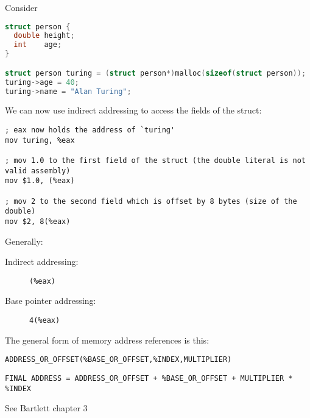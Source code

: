 

Consider
\begin{lstlisting}[language=C]
struct person {
  double height;
  int    age;
}

struct person turing = (struct person*)malloc(sizeof(struct person));
turing->age = 40;
turing->name = "Alan Turing";
\end{lstlisting}

We can now use indirect addressing to access the fields of the struct:

\begin{lstlisting}[language={[x86masm]Assembler}]
; eax now holds the address of `turing'
mov turing, %eax

; mov 1.0 to the first field of the struct (the double literal is not valid assembly)
mov $1.0, (%eax)

; mov 2 to the second field which is offset by 8 bytes (size of the double)
mov $2, 8(%eax)
\end{lstlisting}


Generally:
\begin{description}
\item[Indirect addressing:] \texttt{(\%eax)}
\item[Base pointer addressing:] \texttt{4(\%eax)}
\end{description}

The general form of memory address references is this:

\texttt{ADDRESS\_OR\_OFFSET(\%BASE\_OR\_OFFSET,\%INDEX,MULTIPLIER)}

\texttt{FINAL ADDRESS = ADDRESS\_OR\_OFFSET + \%BASE\_OR\_OFFSET + MULTIPLIER * \%INDEX}

See Bartlett chapter 3

